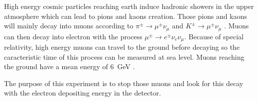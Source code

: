 High energy cosmic particles reaching earth induce hadronic showers in the upper atmosphere which can lead to pions and kaons creation.
Those pions and kaons will mainly decay into muons according to $\pi^\pm\rightarrow\mu^\pm  \nu_\mu$ and  $K^\pm\rightarrow\mu^\pm  \nu_\mu$ \cite{PDG}.
Muons can then decay into electron with the process $\mu^\pm\rightarrow e^\pm \nu_e \nu_\mu$.
Because of special relativity, high energy muons can travel to the ground before decaying so the caracteristic time of this process can be measured at sea level.
Muons reaching the ground have a mean  energy of  $6$~GeV \cite{}.

The purpose of this experiment is to stop those muons  and look for this decay with the electron depositing energy in the detector.







